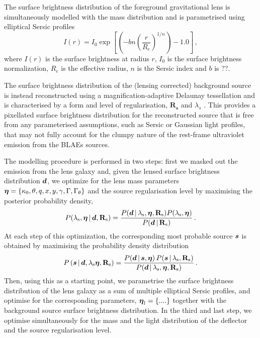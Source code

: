 \documentclass[a4paper,fleqn,usenatbib]{mnras}
\begin{document}
The surface brightness distribution of the foreground gravitational lens is simultaneously modelled with the mass distribution and is parametrised using elliptical Sersic profiles 
\begin{equation}
I \left ( r \right ) = I_0 \exp \left [  \left (  - bn  \left (  \frac{r}{R_e} \right ) ^ {1/n} \right )  - 1.0   \right ]\,,
\end{equation}
where $I(r)$ is the surface brightness at radius $r$, $I_0$ is the surface brightness normalization, $R_{e}$ is the effective radius, $n$ is the Sersic index and $b$ is ??.

The surface brightness distribution of the (lensing corrected) background source is instead reconstructed using a magnification-adaptive Delaunay tessellation and is characterised by a form and level of regularisation, $\mathbf{R_s}$ and $\lambda_s$ \citep[see][for a more detailed description]{V09,V14a}. This provides a pixellated surface brightness distribution for the reconstructed source that is free from any parameterised assumptions, such as Sersic or Gaussian light profiles, that may not fully account for the clumpy nature of the rest-frame ultraviolet emission from the BLAEs sources.

The modelling procedure is performed in two steps: first we masked out the emission from the lens galaxy and, given the lensed surface brightness distribution $\bmath d$, we optimize for the lens mass parameters $\bmath \eta = \{\kappa_0,\theta,q,x,y,\gamma,\Gamma,\Gamma_{\theta}\}$ and the source regularisation level by maximising the posterior probability density, 
\begin{equation}\label{equ:posterior}
    P(\lambda_{\rm{s}},\bmath \eta\,|\,\bmath d,\mathbf
      R_{\rm{s}})=\frac{P(\bmath d\,|\,\lambda_{\rm{s}},\bmath \eta,\mathbf
      R_{\rm{s}})P(\lambda_{\rm{s}},\bmath \eta)}{P(\bmath d\,|\,\mathbf
      R_{\rm{s}})}\,.
\end{equation}
At each step of this optimization, the corresponding most probable source $\bmath s$ is obtained by maximising the probability density distribution 
\begin{equation}
    P\left(\bmath s\,|\,\bmath d,\lambda_{\rm{s}}\bmath \eta,\mathbf R_{\rm{s}}\right)=\frac{P(\bmath d \,|\,\bmath s,\bmath \eta)\, P(\bmath s\,|\,\lambda_{\rm{s}},\mathbf R_{\rm{s}})}{P(\bmath     d \,|\,\lambda_{\rm{s}},\bmath \eta,\mathbf R_{\rm{s}})}\,.
   \label{eq:evidence} 
 \end{equation}
Then, using this as a starting point, we parametrise the surface brightness distribution of the lens galaxy as a sum of multiple elliptical Sersic profiles, and optimise for the corresponding parameters, $\bmath \eta_l =\{....\}$ together with the background source surface brightness distribution. In the third and last step, we optimise simultaneously for the mass and the light distribution of the deflector and the source regularisation level.
\end{document}
